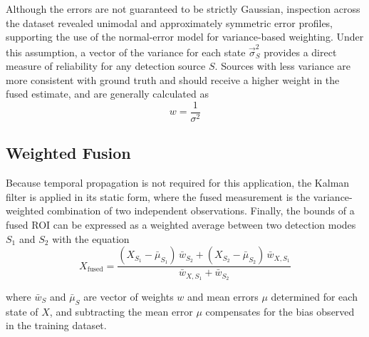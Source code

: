 \documentclass{erauthesis}
\begin{document}
Although the errors are not guaranteed to be strictly Gaussian, inspection across the dataset revealed unimodal and approximately symmetric error profiles, supporting the use of the normal-error model for variance-based weighting.
Under this assumption, a vector of the variance for each state $\vec{\sigma}^{2}_{S}$ provides a direct measure of reliability for any detection source $S$.
Sources with less variance are more consistent with ground truth and should receive a higher weight in the fused estimate, and are generally calculated as
\begin{equation}
w = \frac{1}{\sigma^{2}}
\end{equation}

\subsection{Weighted Fusion}

Because temporal propagation is not required for this application, the Kalman filter is applied in its static form, where the fused measurement is the variance-weighted combination of two independent observations.
Finally, the bounds of a fused ROI can be expressed as a weighted average between two detection modes $S_1$ and $S_2$ with the equation
\begin{equation}
X_{\text{fused}} =
\frac{
(X_{S_1}-\bar{\mu}_{S_1}) \, \bar{w}_{S_2}
+
(X_{S_2}-\bar{\mu}_{S_2}) \, \bar{w}_{X,S_1}
}{
\bar{w}_{X,S_1} + \bar{w}_{S_2}
}
\label{eq:fused_edge}
\end{equation}

where $\bar{w}_{S}$ and $\bar{\mu}_{S}$ are vector of weights $w$ and mean errors $\mu$ determined for each state of $X$, and subtracting the mean error $\mu$ compensates for the bias observed in the training dataset.





\end{document}
